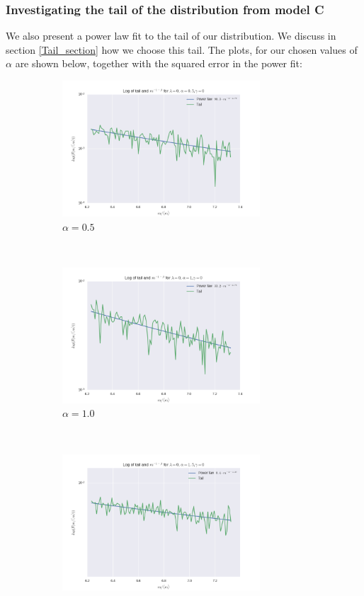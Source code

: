 \documentclass[a4paper, 10pt]{article}
\begin{document}
\subsubsection{Investigating the tail of the distribution from model C}
We also present a power law fit to the tail of our distribution. We discuss in section \ref{Tail_section} how we choose this tail. The plots, for our chosen values of $\alpha$ are shown below, together with the squared error in the power fit:
\begin{figure}[!ht] %
    \begin{subfigure}[H!]{0.5\textwidth}
        \centering
        \includegraphics[height=2.0in]{tailL0A05G0.png} %
        \caption{$\alpha = 0.5$}
    \end{subfigure}%
    ~ 
    \begin{subfigure}[H!]{0.5\textwidth}
        \centering
        \includegraphics[height=2.0in]{tailL0A1G0.png}
        \caption{$\alpha = 1.0$}
    \end{subfigure}
     ~
    \begin{subfigure}[H!]{0.5\textwidth}
        \centering
        \includegraphics[height=2.0in]{tailL0A15G0.png}

\end{subfigure}
\end{figure}
\end{document}
